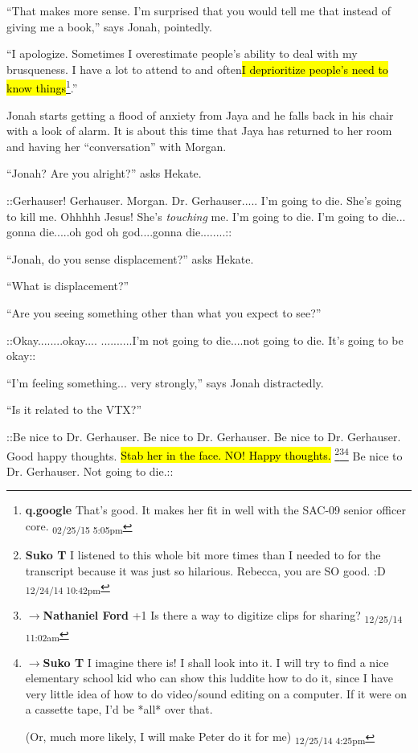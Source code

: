``That makes more sense.  I'm surprised that you would tell me that instead of giving me a book,'' says Jonah, pointedly.

``I apologize.  Sometimes I overestimate people's ability to deal with my brusqueness.  I have a lot to attend to and often\hl{I deprioritize people's need to know things}\footnote{\textbf{q.google }That's good.  It makes her fit in well with the SAC-09 senior officer core. \textsubscript{02/25/15 5:05pm}}.''



Jonah starts getting a flood of anxiety from Jaya and he falls back in his chair with a look of alarm.  It is about this time that Jaya has returned to her room and having her ``conversation'' with Morgan.

``Jonah?  Are you alright?'' asks Hekate.

 {\color[RGB]{255,0,0}::Gerhauser!  Gerhauser.  Morgan.  Dr. Gerhauser..... I'm going to die.  She's going to kill me.   Ohhhhh Jesus!  She's } \textit{ {\color[RGB]{255,0,0}touching} } {\color[RGB]{255,0,0} me.  I'm going to die.  I'm going to die... gonna die.....oh god oh god....gonna die........::} 

``Jonah, do you sense displacement?'' asks Hekate.

``What is displacement?''

``Are you seeing something other than what you expect to see?''

 {\color[RGB]{255,0,0}::Okay........okay.... ..........I'm not going to die....not going to die.  It's going to be okay::} 

``I'm feeling something... very strongly,'' says Jonah distractedly.

``Is it related to the VTX?''

 {\color[RGB]{255,0,0}::Be nice to Dr. Gerhauser.  Be nice to Dr. Gerhauser.  Be nice to Dr. Gerhauser. Good happy thoughts.  }  {\color[RGB]{255,0,0}\hl{Stab her in the face.  NO!  Happy thoughts.}} \footnote{\textbf{Suko T }I listened to this whole bit more times than I needed to for the transcript because it was just so hilarious.  Rebecca, you are SO good. :D \textsubscript{12/24/14 10:42pm}}\footnote{$\rightarrow$\textbf{Nathaniel Ford }+1 Is there a way to digitize clips for sharing? \textsubscript{12/25/14 11:02am}}\footnote{$\rightarrow$\textbf{Suko T }I imagine there is!  I shall look into it.  I will try to find a nice elementary school kid who can show this luddite how to do it, since I have very little idea of how to do video/sound editing on a computer.  If it were on a cassette tape, I'd be *all* over that.

(Or, much more likely, I will make Peter do it for me) \textsubscript{12/25/14 4:25pm}} {\color[RGB]{255,0,0} Be nice to  Dr. Gerhauser.   Not going to die.::} 

